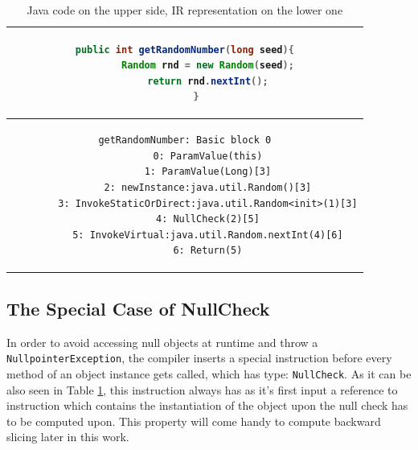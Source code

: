 \begin{table}[h!]
  \centering
  \begin{tabular}{|c|}
  	\hline
	\begin{lstlisting}[language=Java]
	public int getRandomNumber(long seed){
		Random rnd = new Random(seed);
		return rnd.nextInt();
	}
	\end{lstlisting}\\
	\hline
	\begin{lstlisting}[language={[x86masm]Assembler}]
		getRandomNumber: Basic block 0
		0: ParamValue(this)
		1: ParamValue(Long)[3]
		2: newInstance:java.util.Random()[3]
		3: InvokeStaticOrDirect:java.util.Random<init>(1)[3]
		4: NullCheck(2)[5]
		5: InvokeVirtual:java.util.Random.nextInt(4)[6]
		6: Return(5)
	\end{lstlisting} \\
	\hline
  \end{tabular}
    \caption{Java code on the upper side, IR representation on the lower one}
	\label{tab:exampleAdd}
\end{table}

\subsection{The Special Case of NullCheck}
In order to avoid accessing null objects at runtime and throw a \texttt{NullpointerException}, the compiler inserts a special instruction before every method of an object instance gets called, which has type: \texttt{NullCheck}. As it can be also seen in Table \ref{tab:exampleAdd}, this instruction always has as it's first input a reference to instruction which contains the instantiation of the object upon the null check has to be computed upon. This property will come handy to compute backward slicing later in this work.


